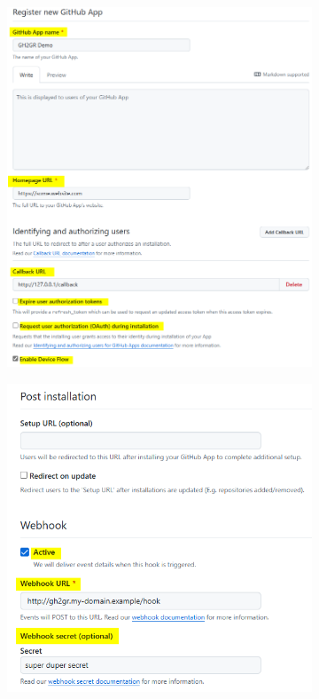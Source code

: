 \begin{figure}
    \centering
    \begin{subfigure}{0.24\textwidth}
        \includegraphics[width=\linewidth]{images/create-app-form-1.png}
    \end{subfigure}
    \hspace*{\fill}   %
    \begin{subfigure}{0.24\textwidth}
        \includegraphics[width=\linewidth]{images/create-app-form-2.png}

\end{subfigure}
\end{figure}
